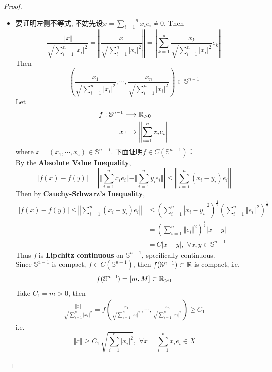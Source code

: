 \begin{thm}
\begin{proof}
\begin{itemize}
				\newpage
				
				\item 要证明左侧不等式, 不妨先设$x = \overset{n}{\underset{i = 1}{\sum}} x_i e_i \neq 0$. Then
				\[ \frac{\Vert x \Vert}{\sqrt{\sum_{i = 1}^n \left| x_i \right|^2}} 
				= \left\Vert \frac{x}{\sqrt{\sum_{i = 1}^n \left| x_i \right|^2}} \right\Vert 
				= \left\Vert \sum_{k = 1}^{n} \frac{x_k}{\sqrt{\sum_{i = 1}^n \left| x_i \right|^2}} e_k \right\Vert \]
				Then
				\[ 
				\left( \frac{x_1}{\sqrt{\sum_{i = 1}^n \left| x_i \right|^2}} , \cdots , \frac{x_n}{\sqrt{\sum_{i = 1}^n \left| x_i \right|^2}} \right) \in \mathbb{S}^{n - 1} 
				\]
				Let
				\begin{align}
					f : \mathbb{S}^{n - 1} &\longrightarrow \mathbb{R}_{> 0} \\
					x &\longmapsto \left\Vert \sum_{i = 1}^{n} x_i e_i \right\Vert
				\end{align}
				where $x = \left( x_1 , \cdots , x_n \right) \in \mathbb{S}^{n - 1}$. 下面证明$f \in C(\mathbb{S}^{n - 1})$：\\
				By the \textbf{Absolute Value Inequality}, 
				\[
					\left| f(x) - f(y) \right| 
					= \left| \Vert \sum_{i = 1}^n x_i e_i \Vert - \Vert \sum_{i = 1}^n y_i e_i \Vert \right| 
					\leq \left\Vert \sum_{i = 1}^n (x_i - y_i) e_i \right\Vert
				\]
				Then by \textbf{Cauchy-Schwarz's Inequality}, 
				\begin{align}
					\left| f(x) - f(y) \right| 
					\leq \left\Vert \sum_{i = 1}^n (x_i - y_i) e_i \right\Vert 
					&\leq \left( \sum_{i = 1}^n \left| x_i - y_i \right|^2 \right)^{\tfrac{1}{2}} \left( \sum_{i = 1}^n \left\Vert e_i \right\Vert^2 \right)^{\tfrac{1}{2}} \\
					&= \left( \sum_{i = 1}^n \left\Vert e_i \right\Vert^2 \right)^{\tfrac{1}{2}} \left| x - y \right| \\
					&= C \left| x - y \right| , \,\, \forall x , y \in \mathbb{S}^{n - 1}
				\end{align}
				Thus $f$ is \textbf{Lipchitz continuous} on $\mathbb{S}^{n - 1}$, specifically continuous. \\
				Since $\mathbb{S}^{n - 1}$ is compact, $f \in C(\mathbb{S}^{n - 1})$, then $f(\mathbb{S}^{n - 1}) \subset \mathbb{R}$ is compact, i.e.
				\[ f(\mathbb{S}^{n - 1}) = [m , M] \subset \mathbb{R}_{> 0} \]
				Take $C_1 = m > 0$, then
				\begin{align}
					\frac{\Vert x \Vert}{\sqrt{\sum_{i = 1}^n \left| x_i \right|^2}} 
					= f \left( \frac{x_1}{\sqrt{\sum_{i = 1}^n \left| x_i \right|^2}} , \cdots , \frac{x_n}{\sqrt{\sum_{i = 1}^n \left| x_i \right|^2}} \right) \geq C_1
				\end{align}
				i.e.
				\[ \Vert x \Vert \geq C_1 \, \sqrt{\sum_{i = 1}^n \left| x_i \right|^2} , \,\, \forall x = \sum_{i = 1}^n x_i e_i \in X \]
			\end{itemize}
		\end{proof}
	\end{thm}
	
